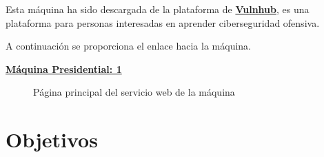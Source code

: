 \documentclass[a4paper]{article}
\newcommand{\machineName}{Máquina Presidential: 1}
\begin{document}
  Esta máquina ha sido descargada de la plataforma de \href{https://www.vulnhub.com/}{\textbf{\color{bluePortada}Vulnhub}},
  es una plataforma para personas interesadas en aprender ciberseguridad ofensiva.

  A continuación se proporciona el enlace hacia la máquina.
  
  \vspace{0.3cm}

  \begin{tcolorbox}[enhanced,attach boxed title to top center={yshift=-3mm,yshifttext=-1mm},
    colback=blue!5!white,colframe=blue!75!black,colbacktitle=bluePortada!80!black,
    title=Dirección url,fonttitle=\bfseries,
    boxed title style={size=small,colframe=red!50!black} ]
    \centering
    \href{https://www.vulnhub.com/entry/presidential-1,500/}{\textbf{\color{bluePortada}\machineName}}
  \end{tcolorbox}

  \vspace{0.5cm}        %


  \begin{figure}[h]
    \centering
    \setlength{\fboxrule}{0.8pt}
    \caption{Página principal del servicio web de la máquina}
  \end{figure}

  

  \section{Objetivos}
  
\end{document}
